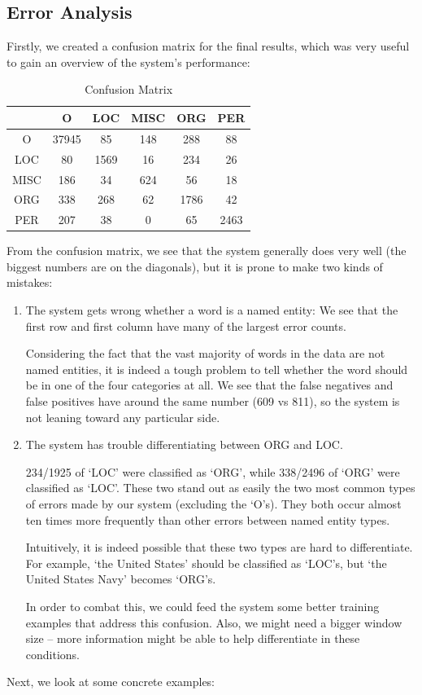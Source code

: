 \documentclass[12pt, twocolumn]{article}
\begin{document}
\subsection{Error Analysis}
Firstly, we created a confusion matrix for the final results, which was very useful to gain an overview of the system's performance:
\begin{table}[H]
\centering
\begin{tabular}{|c|c|c|c|c|c|}
		\hline
		 & O & LOC & MISC & ORG & PER \\\hline
		O & 37945 & 85 & 148 & 288 & 88 \\\hline
		LOC & 80 & 1569 & 16 & 234 & 26 \\\hline
		MISC & 186 & 34 & 624 & 56 & 18 \\\hline
		ORG & 338 & 268 & 62 & 1786 & 42 \\\hline
		PER & 207 & 38 & 0 & 65 & 2463 \\\hline
	\end{tabular}
	\caption{Confusion Matrix}
\label{tab:confusion}
\end{table}
From the confusion matrix, we see that the system generally does very well (the biggest numbers are on the diagonals), but it is prone to make two kinds of mistakes:
\begin{enumerate}
\item
The system gets wrong whether a word is a named entity: We see that the first row and first column have many of the largest error counts.

Considering the fact that the vast majority of words in the data are not named entities, it is indeed a tough problem to tell whether the word should be in one of the four categories at all. We see that the false negatives and false positives have around the same number (609 vs 811), so the system is not leaning toward any particular side.
\item
The system has trouble differentiating between ORG and LOC.

234/1925 of `LOC' were classified as `ORG', while 338/2496 of `ORG' were classified as `LOC'. These two stand out as easily the two most common types of errors made by our system (excluding the `O's). They both occur almost ten times more frequently than other errors between named entity types.

Intuitively, it is indeed possible that these two types are hard to differentiate. For example, `the United States' should be classified as `LOC's, but `the United States Navy' becomes `ORG's.

In order to combat this, we could feed the system some better training examples that address this confusion. Also, we might need a bigger window size -- more information might be able to help differentiate in these conditions.
\end{enumerate}
Next, we look at some concrete examples:
\end{document}
